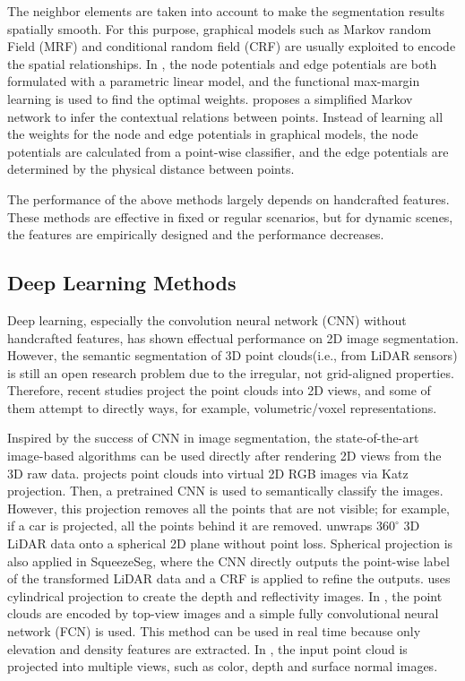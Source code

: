 	The neighbor elements are taken into account to make the segmentation results spatially smooth. For this purpose, graphical models such as Markov random Field (MRF) and conditional random field (CRF) are usually exploited to encode the spatial relationships. In \cite{munoz2009contextual}, the node potentials and edge potentials are both formulated with a parametric linear model, and the functional max-margin learning is used to find the optimal weights. \cite{lu2012simplified} proposes a simplified Markov network to infer the contextual relations between points. Instead of learning all the weights for the node and edge potentials in graphical models, the node potentials are calculated from a point-wise classifier, and the edge potentials are determined by the physical distance between points. 
	
	The performance of the above methods largely depends on handcrafted features. These methods are effective in fixed or regular scenarios, but for dynamic scenes, the features are empirically designed and the performance decreases.
	
	\subsection{Deep Learning Methods}
	Deep learning, especially the convolution neural network (CNN) without handcrafted features, has shown effectual performance on 2D image segmentation\cite{garcia2017review}. However, the semantic segmentation of 3D point clouds(i.e., from LiDAR sensors) is still an open research problem\cite{engelmann2017exploring} due to the irregular, not grid-aligned properties. Therefore, recent studies project the point clouds into 2D views, and some of them attempt to directly ways, for example, volumetric/voxel representations.
	
	Inspired by the success of CNN in image segmentation, the state-of-the-art image-based algorithms can be used directly after rendering 2D views from the 3D raw data. \cite{tosteberg2017semantic} projects point clouds into virtual 2D RGB images via Katz projection. Then, a pretrained CNN is used to semantically classify the images. However, this projection removes all the points that are not visible; for example, if a car is projected, all the points behind it are removed. \cite{dewan17iros} unwraps $360^\circ$ 3D LiDAR data onto a spherical 2D plane without point loss. Spherical projection is also applied in SqueezeSeg\cite{wu2017squeezeseg}, where the CNN directly outputs the point-wise label of the transformed LiDAR data and a CRF is applied to refine the outputs. \cite{piewak2018boosting} uses cylindrical projection to create the depth and reflectivity images. In \cite{caltagirone2017fast}, the point clouds are encoded by top-view images and a simple fully convolutional neural network (FCN) is used. This method can be used in real time because only elevation and density features are extracted. In \cite{lawin2017deep}, the input point cloud is projected into multiple views, such as color, depth and surface normal images. 
	
